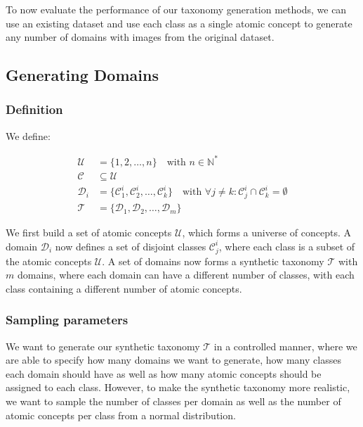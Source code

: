 To now evaluate the performance of our taxonomy generation methods,
we can use an existing dataset and use each class as a single atomic concept
to generate any number of domains with images from the original dataset.

\subsection{Generating Domains}

\subsubsection{Definition}

We define:

\begin{equation}
    \begin{aligned}
        \mathcal{U}   & = \{1, 2, \ldots, n\} \quad \text{with } n \in \mathds{N}^*                                                                                           \\
        \mathcal{C}   & \subseteq \mathcal{U}                                                                                                                                 \\
        \mathcal{D}_i & = \{\mathcal{C}_1^i, \mathcal{C}_2^i, \ldots, \mathcal{C}_k^i\} \quad \text{with } \forall j \neq k: \mathcal{C}_j^i \cap \mathcal{C}_k^i = \emptyset \\
        \mathcal{T}   & = \{\mathcal{D}_1, \mathcal{D}_2, \ldots, \mathcal{D}_m\}
    \end{aligned}
\end{equation}

We first build a set of atomic concepts $\mathcal{U}$,
which forms a universe of concepts.
A domain $\mathcal{D}_i$ now defines a set of disjoint classes $\mathcal{C}_j^i$,
where each class is a subset of the atomic concepts $\mathcal{U}$.
A set of domains now forms a synthetic taxonomy $\mathcal{T}$ with $m$ domains,
where each domain can have a different number of classes,
with each class containing a different number of atomic concepts.

\subsubsection{Sampling parameters}

We want to generate our synthetic taxonomy $\mathcal{T}$ in a controlled manner,
where we are able to specify how many domains we want to generate,
how many classes each domain should have as well as how many atomic concepts
should be assigned to each class.
However, to make the synthetic taxonomy more realistic,
we want to sample the number of classes per domain as well as the number of atomic concepts per class
from a normal distribution.

